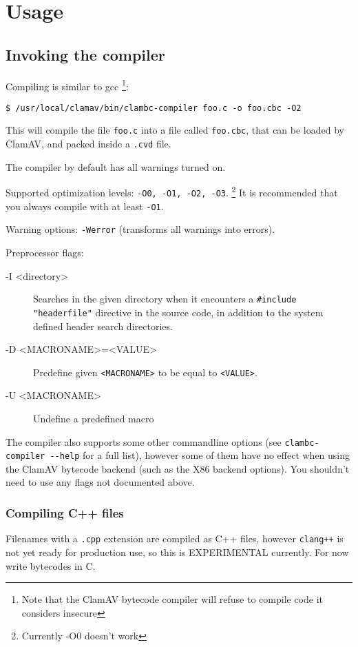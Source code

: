 \chapter{Usage}
\section{Invoking the compiler}
Compiling is similar to gcc \footnote{Note that the ClamAV bytecode compiler will refuse to compile code it considers insecure}:
\begin{verbatim}
$ /usr/local/clamav/bin/clambc-compiler foo.c -o foo.cbc -O2
\end{verbatim}

This will compile the file \verb+foo.c+ into a file called \verb+foo.cbc+,
that can be loaded by ClamAV, and packed inside a \verb+.cvd+ file.

The compiler by default has all warnings turned on.

Supported optimization levels: \verb+-O0, -O1, -O2, -O3+. \footnote{Currently -O0 doesn't work}
It is recommended that you always compile with at least \verb+-O1+.

Warning options: \verb+-Werror+ (transforms all warnings into errors).

Preprocessor flags:
\begin{description}
 \item[-I <directory>] Searches in the given directory when it encounters a \verb+#include "headerfile"+ directive in the source code, in addition
to the system defined header search directories.
 \item[-D <MACRONAME>=<VALUE>] Predefine given \verb+<MACRONAME>+ to be equal to \verb+<VALUE>+.
 \item[-U <MACRONAME>] Undefine a predefined macro
\end{description}

The compiler also supports some other commandline options (see \verb+clambc-compiler --help+ for a full list),
however some of them have no effect when using the ClamAV bytecode backend (such as the X86 backend options).
You shouldn't need to use any flags not documented above.

\subsection{Compiling C++ files}
Filenames with a \verb+.cpp+ extension are compiled as C++ files, however \verb|clang++| is not yet
ready for production use, so this is EXPERIMENTAL currently.
For now write bytecodes in C.

